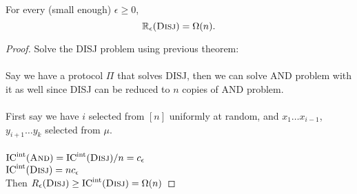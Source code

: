 \begin{theorem}
	For every (small enough) $\epsilon \ge 0$, 
	\[
	\mathbb{R}_\epsilon(\textsc{Disj}) = \Omega(n).
	\]
\end{theorem}

\begin{proof}
	Solve the DISJ problem using previous theorem:\\
	\\
	Say we have a protocol $\Pi$ that solves DISJ, then we can solve AND problem with it as well since DISJ can be reduced to $n$ copies of AND problem.\\
	\\
	First say we have $i$ selected from $[n]$ uniformly at random, and $x_1\dots x_{i-1}$, $y_{i+1}\dots y_k$ selected from $\mu$.\\
	\\
	$\mathrm{IC}^{\mathrm{int}}(\textsc{And}) = \mathrm{IC}^{\mathrm{int}}(\textsc{Disj})/n = c_\epsilon$\\
	$\mathrm{IC}^{\mathrm{int}}(\textsc{Disj}) = nc_\epsilon$\\ 
	Then $R_\epsilon(\textsc{Disj}) \ge \mathrm{IC}^{\mathrm{int}}(\textsc{Disj}) = \Omega(n)$
\end{proof}
